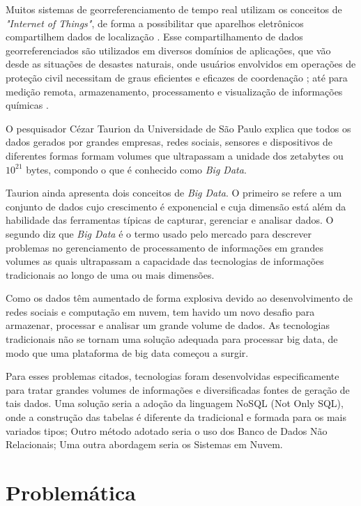 Muitos sistemas de georreferenciamento de tempo real utilizam os conceitos de \textit{"Internet of Things"}, de forma a possibilitar que aparelhos eletrônicos compartilhem dados de localização \cite{Vega}. Esse compartilhamento de dados georreferenciados são utilizados em diversos domínios de aplicações, que vão desde as situações de desastes naturais, onde usuários envolvidos em operações de proteção civil necessitam de graus eficientes e eficazes de coordenação \cite{Barroso}; até para medição remota, armazenamento, processamento e visualização de informações químicas \cite{Vega}.

O pesquisador Cézar Taurion da Universidade de São Paulo explica que todos os dados gerados por grandes empresas, redes sociais, sensores e dispositivos de diferentes formas formam volumes que ultrapassam a unidade dos zetabytes ou $ 10^{21} $ bytes\cite{Taurion-big-data}, compondo o que é conhecido como \textit{Big Data}\cite{Taurion-big-data}.

Taurion ainda apresenta dois conceitos de \textit{Big Data}. O primeiro se refere a um conjunto de dados cujo crescimento é exponencial e cuja dimensão está além da habilidade das ferramentas típicas de capturar, gerenciar e analisar dados\cite{Taurion-big-data}. O segundo diz que \textit{Big Data} é o termo usado pelo mercado para descrever problemas no gerenciamento de processamento de informações em grandes volumes as quais ultrapassam a capacidade das tecnologias de informações tradicionais ao longo de uma ou mais dimensões\cite{Taurion-big-data}.

Como os dados têm aumentado de forma explosiva devido ao desenvolvimento de redes sociais e computação em nuvem, tem havido um novo desafio para armazenar, processar e analisar um grande volume de dados. As tecnologias tradicionais não se tornam uma solução adequada para processar big data, de modo que uma plataforma de big data começou a surgir\cite{Park-Big-Data}. 

Para esses problemas citados, tecnologias foram desenvolvidas especificamente para tratar grandes volumes de informações e diversificadas fontes de geração de tais dados. Uma solução seria a adoção da linguagem NoSQL (Not Only SQL), onde a construção das tabelas é diferente da tradicional e formada para os mais variados tipos; Outro método adotado seria o uso dos Banco de Dados Não Relacionais; Uma outra abordagem seria os Sistemas em Nuvem\cite{Taurion-big-data}.
 
\section{Problemática}

